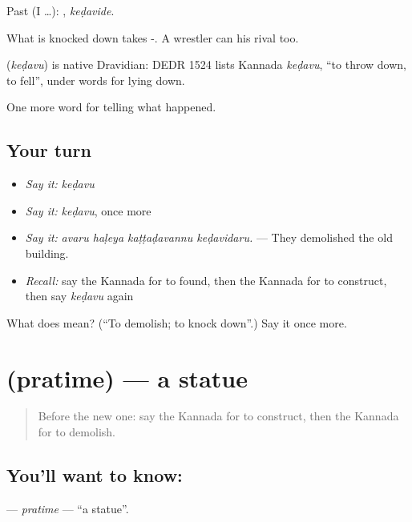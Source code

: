 Past (I …): , \emph{keḍavide}.

What is knocked down takes -. A wrestler can  his rival too.

\begin{cousinweb}
\textbf{} (\emph{keḍavu}) is native Dravidian: DEDR 1524 lists Kannada \emph{keḍavu}, \textquotedblleft{}to throw down, to fell\textquotedblright{}, under words for lying down.
\end{cousinweb}

\begin{grammarlens}[title={What you've built}]
One more word for telling what happened.
\end{grammarlens}

\subsection*{Your turn}
\begin{itemize}
\raggedright
  \item \emph{Say it:} \emph{keḍavu}
  \item \emph{Say it:} \emph{keḍavu}, once more
  \item \emph{Say it:} \emph{avaru haḷeya kaṭṭaḍavannu keḍavidaru.} — They demolished the old building.
  \item \emph{Recall:} say the Kannada for to found, then the Kannada for to construct, then say \emph{keḍavu} again
\end{itemize}

\begin{tcolorbox}[breakable,colback=teal!4,colframe=teal!35!black,title={Before you move on}]
What does  mean? (\textquotedblleft{}To demolish; to knock down\textquotedblright{}.) Say it once more.
\end{tcolorbox}
\section[\texorpdfstring{\kn{ಪ್ರತಿಮೆ} (pratime)}{ಪ್ರತಿಮೆ (pratime)}]{ (pratime) — a statue}

\label{lesson:KA-C362-pratime}



\begin{quote}
Before the new one: say the Kannada for to construct, then the Kannada for to demolish.
\end{quote}

\subsection*{You'll want to know: }
\textbf{} — \emph{pratime} — \textquotedblleft{}a statue\textquotedblright{}.

